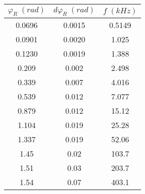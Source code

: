 \begin{tabular}{cc|c}
\toprule
$\varphi_{R} \; (rad)$ & $d\varphi_{R} \; (rad)$ & $f \; (kHz)$ \\
\midrule
                0.0696 &                  0.0015 &       0.5149 \\
                0.0901 &                  0.0020 &        1.025 \\
                0.1230 &                  0.0019 &        1.388 \\
                 0.209 &                   0.002 &        2.498 \\
                 0.339 &                   0.007 &        4.016 \\
                 0.539 &                   0.012 &        7.077 \\
                 0.879 &                   0.012 &        15.12 \\
                 1.104 &                   0.019 &        25.28 \\
                 1.337 &                   0.019 &        52.06 \\
                  1.45 &                    0.02 &        103.7 \\
                  1.51 &                    0.03 &        203.7 \\
                  1.54 &                    0.07 &        403.1 \\
\bottomrule
\end{tabular}
